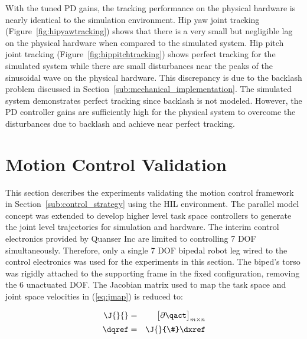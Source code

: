 
With the tuned PD gains, the tracking performance on the physical hardware is nearly identical to the simulation environment. Hip yaw joint tracking (Figure~\ref{fig:hipyawtracking}) shows that there is a very small but negligible lag on the physical hardware when compared to the simulated system. Hip pitch joint tracking (Figure~\ref{fig:hippitchtracking}) shows perfect tracking for the simulated system while there are small disturbances near the peaks of the sinusoidal wave on the physical hardware. This discrepancy is due to the backlash problem discussed in Section~\ref{sub:mechanical_implementation}. The simulated system demonstrates perfect tracking since backlash is not modeled. However, the PD controller gains are sufficiently high for the physical system to overcome the disturbances due to backlash and achieve near perfect tracking. 



\section{Motion Control Validation} %
\label{sec:motion_control_validation}
This section describes the experiments validating the motion control framework in Section~\ref{sub:control_strategy} using the HIL environment. The parallel model concept was extended to develop higher level task space controllers to generate the joint level trajectories for simulation and hardware. The interim control electronics provided by Quanser Inc are limited to controlling 7 DOF simultaneously. Therefore, only a single 7 DOF bipedal robot leg wired to the control electronics was used for the experiments in this section. The biped's torso was rigidly attached to the supporting frame in the fixed configuration, removing the 6 unactuated DOF. The Jacobian matrix used to map the task space and joint space velocities in (\ref{eq:jmap}) is reduced to: 

\begin{eqnarray}
	\J{}{} &=& \begin{bmatrix} \partial \qact \\ \end{bmatrix}_{m \times n} \\
	\dqref &=& \J{}{\#} \dxref \label{eq:calcqref}
\end{eqnarray}


